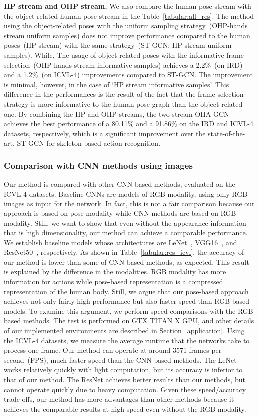 \documentclass[10pt,twocolumn,letterpaper]{article}
\begin{document}
\textbf{HP stream and OHP stream.} 
We also compare the human pose stream with the object-related human pose stream in the Table~\ref{tabular:all_res}. 
The method using the object-related poses with the uniform sampling strategy~(OHP-hands stream  uniform samples) does not improve performance compared to the human poses~(HP stream) with the same strategy~(ST-GCN; HP stream  uniform samples).
While, 
The usage of object-related poses with the informative frame selection~(OHP-hands stream  informative samples) achieves a 2.2\%~(on IRD) and a 1.2\%~(on ICVL-4) improvements compared to ST-GCN. The improvement is minimal, however, in the case of `HP stream  informative samples'.
This difference in the performances is the result of the fact that the frame selection strategy is more informative to the human pose graph than the object-related one. By combining the HP and OHP streams, the two-stream OHA-GCN 
achieves the best performance of a 80.11\% and a 91.86\% on the IRD and ICVL-4 datasets, respectively, which 
is a significant improvement over the state-of-the-art, ST-GCN for skeleton-based action recognition.


\subsubsection{Comparison with CNN methods using images}
\quad Our method is compared with other CNN-based methods, evaluated on the ICVL-4 datasets.
Baseline CNNs are models of RGB modality, using only RGB images as input for the network.
In fact, this is not a fair comparison because our approach is based on pose modality while CNN methods are based on RGB modality.
Still, we want to show that even without the appearance information that is high dimensionality, our method can achieve a comparable performance.
We establish baseline models whose architectures are LeNet~\cite{lecun1998gradient}, VGG16~\cite{simonyan2014very}, and ResNet50~\cite{he2016deep}, respectively.
As shown in Table~\ref{tabular:res_icvl}, the accuracy of our method is lower than some of CNN-based methods, as expected. 
This result is explained by the difference in the modalities.
RGB modality has more information for actions while pose-based representation is a compressed representation of the human body. 
Still, we argue that our pose-based approach achieves not only fairly high performance but also faster speed than RGB-based models.
To examine this argument, we perform speed comparisons with the RGB-based methods.
The test is performed on GTX TITAN X GPU, and other details of our implemented environments are described in Section~\ref{application}.
Using the ICVL-4 datasets, we measure the average runtime that the networks take to process one frame.
Our method can operate at around 3571 frames per second~(FPS), much faster speed than the CNN-based methods.
The LeNet works relatively quickly with light computation, but its accuracy is inferior to that of our method.
The ResNet achieves better results than our methods, but cannot operate quickly due to heavy computation.
Given these speed/accuracy trade-offs, our method has more advantages than other methods because it achieves the comparable results at high speed even without the RGB modality.
\end{document}
